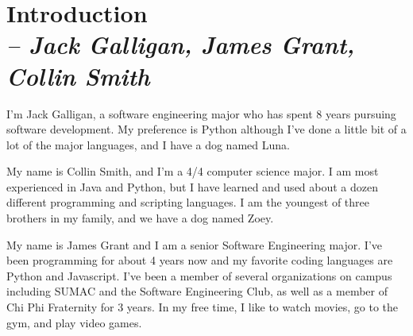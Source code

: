 \chapter{Introduction \\
\small{\textit{-- Jack Galligan, James Grant, Collin Smith}}
\label{Chapter::Introduction}}

I'm Jack Galligan, a software engineering major who has spent 8 years pursuing software development.  My preference is Python although I've done a little bit of a lot of the major languages, and I have a dog named Luna.

My name is Collin Smith, and I'm a 4/4 computer science major. I am most experienced in Java and Python, but I have learned and used about a dozen different programming and scripting languages. I am the youngest of three brothers in my family, and we have a dog named Zoey.

My name is James Grant and I am a senior Software Engineering major. I’ve been programming for about 4 years now and my favorite coding languages are Python and Javascript. I’ve
been a member of several organizations on campus including SUMAC and the Software Engineering Club, as well as a member of Chi Phi Fraternity for 3 years. In my free time, I like to watch
movies, go to the gym, and play video games.
